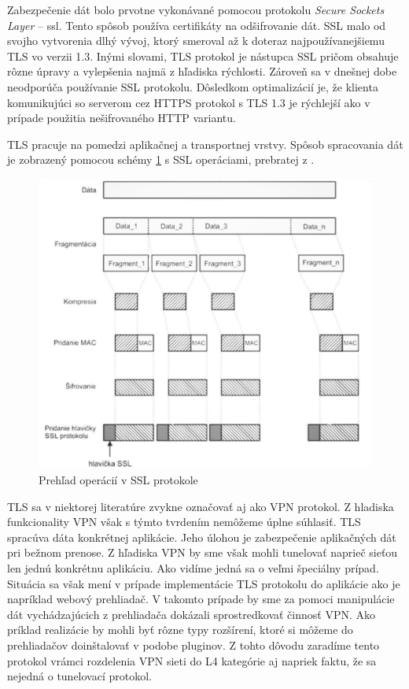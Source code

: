 Zabezpečenie dát bolo prvotne vykonávané pomocou protokolu \textit{Secure Sockets Layer} -- \acrshort{ssl}. Tento spôsob používa certifikáty na odšifrovanie dát. SSL malo od svojho vytvorenia dlhý vývoj, ktorý smeroval až k doteraz najpoužívanejšiemu TLS vo verzii 1.3. Inými slovami, TLS protokol je nástupca SSL pričom obsahuje rôzne úpravy a vylepšenia najmä z hľadiska rýchlosti. Zároveň sa v dnešnej dobe neodporúča používanie SSL protokolu. Dôsledkom optimalizácií je, že klienta komunikujúci so serverom cez HTTPS protokol s TLS 1.3 je rýchlejší ako v prípade použitia nešifrovaného HTTP variantu. 

TLS pracuje na pomedzi aplikačnej a transportnej vrstvy. Spôsob spracovania dát je zobrazený pomocou schémy \ref{ssl} s SSL operáciami, prebratej z \cite{biks}.
 
\begin{figure}[!ht]
	\centering
	\includegraphics[width=0.7\linewidth]{figures/ssl}
	\caption{Prehľad operácií v SSL protokole}
	\label{ssl}
\end{figure}
TLS sa v niektorej literatúre zvykne označovať aj ako VPN protokol. Z hladiska funkcionality VPN však s týmto tvrdením nemôžeme úplne súhlasiť. TLS spracúva dáta konkrétnej aplikácie. Jeho úlohou je zabezpečenie aplikačných dát pri bežnom prenose. Z hľadiska VPN by sme však mohli tunelovať naprieč sieťou len jednú konkrétnu aplikáciu. Ako vidíme jedná sa o veľmi špeciálny prípad. Situácia sa však mení v prípade implementácie TLS protokolu do aplikácie ako je napríklad webový prehliadač. V takomto prípade by sme za pomoci manipulácie dát vychádzajúcich z prehliadača dokázali sprostredkovať činnosť VPN. Ako príklad realizácie by mohli byť rôzne typy rozšírení, ktoré si môžeme do prehliadačov doinštalovať v podobe pluginov. Z tohto dôvodu zaradíme tento protokol vrámci rozdelenia VPN sieti do L4 kategórie aj napriek faktu, že sa nejedná o tunelovací protokol.
     
